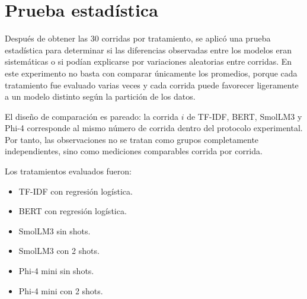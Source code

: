 \documentclass[12pt]{article}
\begin{document}
\section{Prueba estadística}

Después de obtener las 30 corridas por tratamiento, se aplicó una prueba estadística para
determinar si las diferencias observadas entre los modelos eran sistemáticas o si podían
explicarse por variaciones aleatorias entre corridas. En este experimento no basta con comparar
únicamente los promedios, porque cada tratamiento fue evaluado varias veces y cada corrida puede
favorecer ligeramente a un modelo distinto según la partición de los datos.

El diseño de comparación es pareado: la corrida $i$ de TF-IDF, BERT, SmolLM3 y Phi-4 corresponde
al mismo número de corrida dentro del protocolo experimental. Por tanto, las observaciones no se
tratan como grupos completamente independientes, sino como mediciones comparables corrida por
corrida.

Los tratamientos evaluados fueron:

\begin{itemize}
    \item TF-IDF con regresión logística.
    \item BERT con regresión logística.
    \item SmolLM3 sin shots.
    \item SmolLM3 con 2 shots.
    \item Phi-4 mini sin shots.
    \item Phi-4 mini con 2 shots.
\end{itemize}
\end{document}
